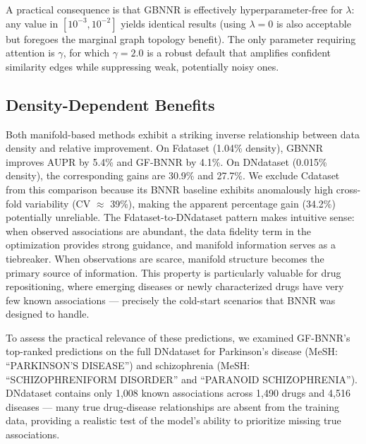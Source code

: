 \documentclass[unnumsec,webpdf,contemporary,large]{oup-authoring-template}
\begin{document}
A practical consequence is that GBNNR is effectively hyperparameter-free for $\lambda$: any value in $[10^{-3}, 10^{-2}]$ yields identical results (using $\lambda = 0$ is also acceptable but foregoes the marginal graph topology benefit). The only parameter requiring attention is $\gamma$, for which $\gamma = 2.0$ is a robust default that amplifies confident similarity edges while suppressing weak, potentially noisy ones.

\subsection{Density-Dependent Benefits}
\label{sec:density_dependent}

Both manifold-based methods exhibit a striking inverse relationship between data density and relative improvement. On Fdataset (1.04\% density), GBNNR improves AUPR by 5.4\% and GF-BNNR by 4.1\%. On DNdataset (0.015\% density), the corresponding gains are 30.9\% and 27.7\%. We exclude Cdataset from this comparison because its BNNR baseline exhibits anomalously high cross-fold variability (CV $\approx$ 39\%), making the apparent percentage gain (34.2\%) potentially unreliable. The Fdataset-to-DNdataset pattern makes intuitive sense: when observed associations are abundant, the data fidelity term in the optimization provides strong guidance, and manifold information serves as a tiebreaker. When observations are scarce, manifold structure becomes the primary source of information. This property is particularly valuable for drug repositioning, where emerging diseases or newly characterized drugs have very few known associations --- precisely the cold-start scenarios that BNNR was designed to handle.

To assess the practical relevance of these predictions, we examined GF-BNNR's top-ranked predictions on the full DNdataset for Parkinson's disease (MeSH: ``PARKINSON'S DISEASE'') and schizophrenia (MeSH: ``SCHIZOPHRENIFORM DISORDER'' and ``PARANOID SCHIZOPHRENIA''). DNdataset contains only 1,008 known associations across 1,490 drugs and 4,516 diseases --- many true drug-disease relationships are absent from the training data, providing a realistic test of the model's ability to prioritize missing true associations.
\end{document}
